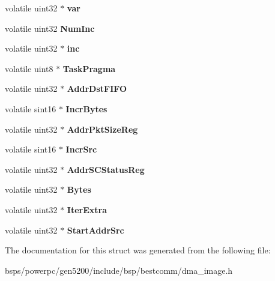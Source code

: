 \begin{DoxyCompactItemize}
\mbox{\label{structtask__info0_ab6095ee46c42107ab3c6449c61169a67}} 
volatile uint32 $\ast$ {\bfseries var}
\item 
\mbox{\label{structtask__info0_afe5e4a5c3d519186769dc1ac5afca3d7}} 
volatile uint32 {\bfseries Num\+Inc}
\item 
\mbox{\label{structtask__info0_a47f86ab9227c9f93f55209855a14a990}} 
volatile uint32 $\ast$ {\bfseries inc}
\item 
\mbox{\label{structtask__info0_a1d1a0f4884eb176248da97dba1cb5239}} 
volatile uint8 $\ast$ {\bfseries Task\+Pragma}
\item 
\mbox{\label{structtask__info0_a28f25032d8b41d35d8b5ee42bbb26b9c}} 
volatile uint32 $\ast$ {\bfseries Addr\+Dst\+F\+I\+FO}
\item 
\mbox{\label{structtask__info0_af985242892548d89ddfb4e51aa5b6854}} 
volatile sint16 $\ast$ {\bfseries Incr\+Bytes}
\item 
\mbox{\label{structtask__info0_a0c591156f178199afc7b3f29e6d55672}} 
volatile uint32 $\ast$ {\bfseries Addr\+Pkt\+Size\+Reg}
\item 
\mbox{\label{structtask__info0_a942859c26142ee8384c795c14cf7a38f}} 
volatile sint16 $\ast$ {\bfseries Incr\+Src}
\item 
\mbox{\label{structtask__info0_a418d9359087d41a246cdfb6279957a2f}} 
volatile uint32 $\ast$ {\bfseries Addr\+S\+C\+Status\+Reg}
\item 
\mbox{\label{structtask__info0_a4b4af1e76e89e9043a5d310eb281558c}} 
volatile uint32 $\ast$ {\bfseries Bytes}
\item 
\mbox{\label{structtask__info0_ae32b8649ee9548472caf7d9c79734b07}} 
volatile uint32 $\ast$ {\bfseries Iter\+Extra}
\item 
\mbox{\label{structtask__info0_a253f32544d710d39ed4a4bcdcb1776d1}} 
volatile uint32 $\ast$ {\bfseries Start\+Addr\+Src}
\end{DoxyCompactItemize}


The documentation for this struct was generated from the following file\+:\begin{DoxyCompactItemize}
\item 
bsps/powerpc/gen5200/include/bsp/bestcomm/dma\+\_\+image.\+h\end{DoxyCompactItemize}
